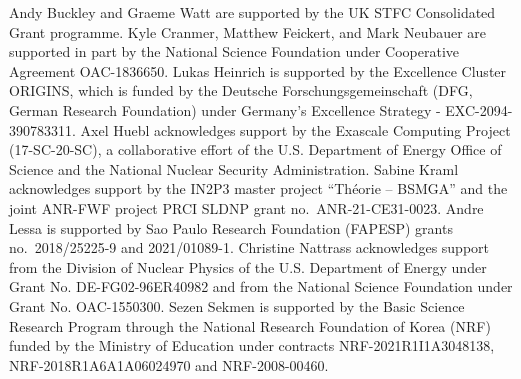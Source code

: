 \documentclass[11pt]{article}
\begin{document}
Andy Buckley and Graeme Watt are supported by the UK STFC Consolidated Grant programme.
Kyle Cranmer, Matthew Feickert, and Mark Neubauer are supported in part by the National Science Foundation under Cooperative Agreement OAC-1836650.
Lukas Heinrich is supported by the Excellence Cluster ORIGINS, which is funded by the Deutsche Forschungsgemeinschaft (DFG, German Research Foundation) under Germany’s Excellence Strategy - EXC-2094-390783311.
Axel Huebl acknowledges support by the Exascale Computing Project (17-SC-20-SC), a collaborative effort of the U.S. Department of Energy Office of Science and the National Nuclear Security Administration.
Sabine Kraml acknowledges support by the IN2P3 master project ``Th\'eorie -- BSMGA'' and the joint ANR-FWF project PRCI SLDNP grant no.~ANR-21-CE31-0023.
Andre Lessa is supported by Sao Paulo Research Foundation (FAPESP) grants no.~2018/25225-9 and 2021/01089-1.
Christine Nattrass acknowledges support from the Division of Nuclear Physics of the U.S. Department of Energy under Grant No. DE-FG02-96ER40982 and from the National Science Foundation under Grant No. OAC-1550300.
Sezen Sekmen is supported by the Basic Science Research Program through the National Research Foundation of Korea (NRF) funded by the Ministry of Education under contracts NRF-2021R1I1A3048138, NRF-2018R1A6A1A06024970 and NRF-2008-00460. 

\def\thefootnote{\fnsymbol{footnote}}
\setcounter{footnote}{0}

{}



\clearpage
\printglossaries
\end{document}
